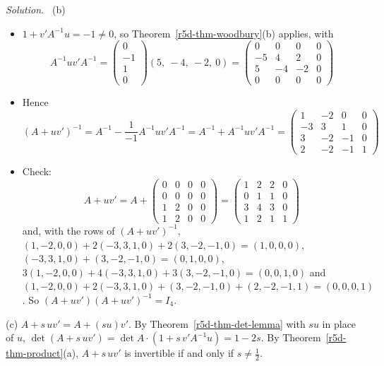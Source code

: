 \documentclass[12pt]{article}
\theoremstyle{definition}
\newenvironment{solution}{\par\noindent\textit{Solution.}\ }{\par\smallskip}
\begin{document}
\begin{solution}
(b)
\begin{itemize}
\item \(1+v'A^{-1}u=-1\ne0\), so Theorem~\ref{r5d-thm-woodbury}(b) applies, with
\[
A^{-1}uv'A^{-1}=\begin{pmatrix}0\\-1\\1\\0\end{pmatrix}(5,\ -4,\ -2,\ 0)
=\begin{pmatrix}0&0&0&0\\-5&4&2&0\\5&-4&-2&0\\0&0&0&0\end{pmatrix}
\]
\item Hence
\[
(A+uv')^{-1}=A^{-1}-\frac1{-1}A^{-1}uv'A^{-1}=A^{-1}+A^{-1}uv'A^{-1}
=\begin{pmatrix}1&-2&0&0\\-3&3&1&0\\3&-2&-1&0\\2&-2&-1&1\end{pmatrix}
\]
\item Check:
\[
A+uv'=A+\begin{pmatrix}0&0&0&0\\0&0&0&0\\1&2&0&0\\1&2&0&0\end{pmatrix}=\begin{pmatrix}1&2&2&0\\0&1&1&0\\3&4&3&0\\1&2&1&1\end{pmatrix}
\]
and, with the rows of \((A+uv')^{-1}\), \((1,-2,0,0)+2(-3,3,1,0)+2(3,-2,-1,0)=(1,0,0,0)\),
\((-3,3,1,0)+(3,-2,-1,0)=(0,1,0,0)\), \(3(1,-2,0,0)+4(-3,3,1,0)+3(3,-2,-1,0)=(0,0,1,0)\) and
\((1,-2,0,0)+2(-3,3,1,0)+(3,-2,-1,0)+(2,-2,-1,1)=(0,0,0,1)\). So \((A+uv')(A+uv')^{-1}=I_4\).
\end{itemize}

(c) \(A+s\,uv'=A+(su)v'\). By Theorem~\ref{r5d-thm-det-lemma} with \(su\) in place of \(u\),
\(\det(A+s\,uv')=\det A\cdot(1+s\,v'A^{-1}u)=1-2s\). By Theorem~\ref{r5d-thm-product}(a), \(A+s\,uv'\) is invertible if
and only if \(s\ne\frac12\).
\end{solution}
\end{document}
